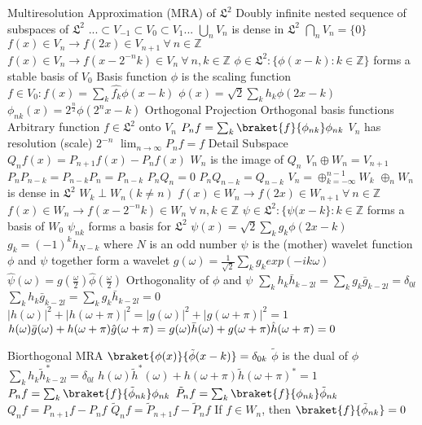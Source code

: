 \documentclass[14pt]{extarticle}
\begin{document}
\begin{outline}
			\2	Multiresolution Approximation (MRA) of $\mathfrak{L}^2$
				\3	Doubly infinite nested sequence of subspaces of $\mathfrak{L}^2$
					\4	$... \subset V_{-1} \subset V_0 \subset V_1 ...$
				\3	$\bigcup_n V_n$ is dense in $\mathfrak{L}^2$
				\3	$\bigcap_n V_n = \{0\}$
				\3	$f(x) \in V_n \rightarrow f(2x) \in V_{n+1}~\forall~n\in \mathbb{Z}$
				\3	$f(x) \in V_n \rightarrow f(x - 2^{-n}k) \in V_n~\forall~n,k \in \mathbb{Z}$
				\3	$\phi \in \mathfrak{L}^2 : \{\phi(x - k) : k \in \mathbb{Z}\}$ forms a stable basis of $V_0$
				\3	Basis function $\phi$ is the scaling function
				\3	$f \in V_0 : f(x) = \sum_k \hat{f_k}\phi(x - k)$
				\3	$\phi(x) = \sqrt{2}\sum_k h_k \phi(2x - k)$
				\3	$\phi_{nk}(x) = 2^{\frac{n}{2}} \phi(2^nx - k)$
				\3	Orthogonal Projection 
					\4	Orthogonal basis functions
					\4	Arbitrary function $f \in \mathfrak{L}^2$ onto $V_n$
					\4	$P_nf = \sum_k \braket{f}{\phi_{nk}}\phi_{nk}$
					\4	$V_n$ has resolution (scale) $2^{-n}$
					\4	$\lim_{n \rightarrow \infty} P_nf = f$
				\3	Detail Subspace
					\4	$Q_nf(x) = P_{n+1}f(x) - P_nf(x)$
					\4	$W_n$ is the image of $Q_n$
					\4	$V_n \oplus W_n = V_{n+1}$
					\4	$P_nP_{n-k} = P_{n-k}P_n = P_{n-k}$
					\4	$P_nQ_n = 0$
					\4	$P_nQ_{n-k} = Q_{n-k}$
					\4	$V_n = \oplus_{k = -\infty}^{n-1} W_k$
					\4	$\oplus_nW_n$ is dense in $\mathfrak{L}^2$
					\4	$W_k \perp W_n (k \ne n)$
					\4	$f(x) \in W_n \rightarrow f(2x) \in W_{n+1}~\forall~n\in \mathbb{Z}$
					\4	$f(x) \in W_n \rightarrow f(x - 2^{-n}k) \in W_n~\forall~n,k \in \mathbb{Z}$
				\3	$\psi \in \mathfrak{L}^2 : \{\psi(x - k\} : k \in \mathbb{Z}$ forms a basis of $W_0$
				\3	$\psi_{nk}$ forms a basis for $\mathfrak{L}^2$
				\3	$\psi(x) = \sqrt{2} \sum_k g_k \phi(2x - k)$
				\3	$g_k = (-1)^kh_{N-k}$ where $N$ is an odd number
				\3	$\psi$ is the (mother) wavelet function
				\3	$\phi$ and $\psi$ together form a wavelet
				\3	$g(\omega) = \frac{1}{\sqrt{2}}\sum_k g_k exp(-ik\omega)$
				\3	$\hat{\psi}(\omega) = g(\frac{\omega}{2})\hat{\phi}(\frac{\omega}{2})$
				\3	Orthogonality of $\phi$ and $\psi$
					\4	$\sum_k h_k \bar{h}_{k-2l} = \sum_kg_k\bar{g}_{k-2l} = \delta_{0l}$
					\4	$\sum_k h_k \bar{g}_{k-2l} = \sum_kg_k\bar{h}_{k-2l} = 0$
					\4	$|h(\omega)|^2 + |h(\omega + \pi)|^2 = |g(\omega)|^2 + |g(\omega + \pi)|^2 = 1$
					\4	$h(\omega)\bar{g}(\omega) + h(\omega + \pi) \hat{g}(\omega + \pi) = \\ 
							 g(\omega)\bar{h}(\omega) + g(\omega + \pi) \hat{h}(\omega + \pi) = 0$
			
			\2	Biorthogonal MRA 
				\3	$\braket{\phi(x)}{\tilde{\phi}(x - k)}	= \delta_{0k}$
				\3	$\tilde{\phi}$ is the dual of $\phi$
				\3	$\sum_k h_k \tilde{h}^*_{k-2l} = \delta_{0l}$
				\3	$h(\omega) \tilde{h}^*(\omega) + h(\omega + \pi) \tilde{h}(\omega + \pi)^* = 1$
				\3	$P_nf = \sum_k \braket{f}{\tilde{\phi}_{nk}}\phi_{nk}$
				\3	$\tilde{P}_nf = \sum_k \braket{f}{\phi_{nk}}\tilde{\phi}_{nk}$
				\3	$Q_nf = P_{n+1}f - P_nf$
				\3	$\tilde{Q}_nf = \tilde{P}_{n+1}f - \tilde{P}_nf$
				\3	If $f \in W_n$, then $\braket{f}{\tilde{\phi}_{nk}} = 0$


\end{outline}
\end{document}
